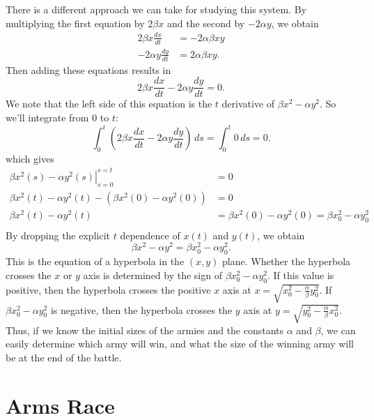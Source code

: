 \documentclass[reqno]{immbook}
\begin{document}
There is a different approach we can take for studying
this system.
By multiplying the first equation by $2\beta x$ and the
second by $-2\alpha y$, we obtain
\begin{equation}
\begin{split}
 2\beta x\frac{dx}{dt} & = -2 \alpha \beta x y \\
 -2\alpha y\frac{dy}{dt} & = 2 \alpha \beta x y.
\end{split}
\end{equation}
Then adding these equations results in
\begin{equation}
   2\beta x\frac{dx}{dt} -2\alpha y\frac{dy}{dt} = 0.
\end{equation}
We note that the left side of this equation is
the $t$ derivative of $\beta x^2 - \alpha y^2$.
So we'll integrate from $0$ to $t$:
\begin{equation}
   \int_0^t \left(2\beta x\frac{dx}{dt} -2\alpha y\frac{dy}{dt}\right)\, ds = \int_0^t 0 \, ds = 0.
\end{equation}
which gives
\begin{equation}
\begin{split}
  \left.\beta x^2(s) - \alpha y^2(s)\right|_{s=0}^{s=t} & = 0 \\
   \beta x^2(t) - \alpha y^2(t) - (\beta x^2(0) - \alpha y^2(0)) & = 0 \\
      \beta x^2(t) - \alpha y^2(t) & = \beta x^2(0) - \alpha y^2(0) =
         \beta x_0^2 - \alpha y_0^2 \\
\end{split}
\end{equation}
By dropping the explicit $t$ dependence of $x(t)$
and $y(t)$, we obtain
\begin{equation}
   \beta x^2 - \alpha y^2 = \beta x_0^2 - \alpha y_0^2.
   \label{eqn:lanchester_hyperbola}
\end{equation}
This is the equation of a hyperbola in the $(x,y)$ plane.
Whether the hyperbola crosses the $x$ or $y$ axis is
determined by the sign of
$\beta x_0^2 - \alpha y_0^2$.
If this value is positive, then the hyperbola
crosses the positive $x$ axis
at $x=\sqrt{x_0^2 - \frac{\alpha}{\beta} y_0^2}$.
If $\beta x_0^2 - \alpha y_0^2$
is negative, then the hyperbola
crosses the $y$ axis at
$y = \sqrt{y_0^2 - \frac{\alpha}{\beta} x_0^2}$.
Thus, if we know the initial sizes of the armies
and the constants $\alpha$ and $\beta$, we can
easily determine which army will win, and what the
size of the winning army will be at the end of the
battle.
\section{Arms Race}
%
\end{document}
